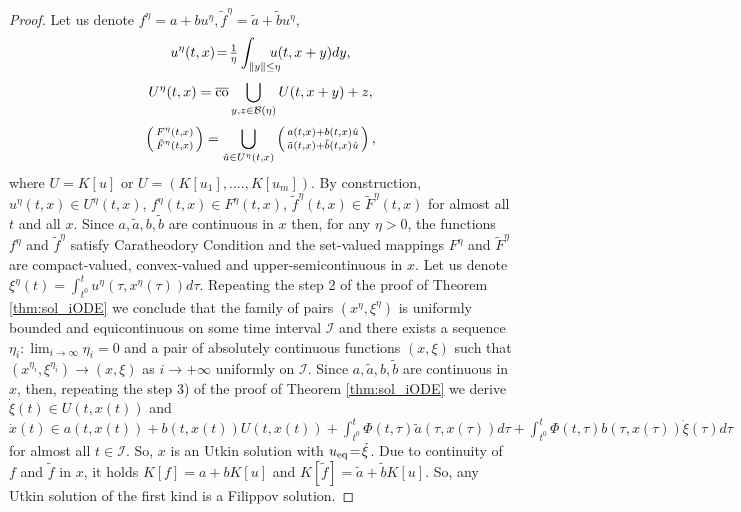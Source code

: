\documentclass{article}
\newcommand{\co}{\mathrm{co}}
\begin{document}
\begin{proof}
{
	Let us denote $f^{\eta}\!=\!a+bu^{\eta}, \tilde f^{\eta}\!=\!\tilde a+\tilde bu^{\eta}$, \vspace{-1mm}
	\[
   u^{\eta}(t,x)\!=\!\tfrac{1}{\eta}\int_{\|y\|\leq \eta} \!\!\!\!\!\!u(t,x+y) dy, \vspace{-1mm}
	\]
\[
U^{\eta}(t,x)=\overline{\co} \bigcup_{y,z\in \mathcal{B}(\eta)}  U(t,x+y)+z,\vspace{-1mm}
\]
\[
\left( 
\begin{smallmatrix}
	F^{\eta}(t,x)\\
	\tilde F^{\eta}(t,x)
\end{smallmatrix}
\right)=  \bigcup_{\hat u\in U^{\eta}(t,x)} \left( 
\begin{smallmatrix}
	a(t,x)+b(t,x)\hat u\\
	\tilde a(t,x)+\tilde b(t,x)\hat u
\end{smallmatrix}
\right),\vspace{-1mm}
\]
where $U=K[u]$ or $U=(K[u_1],....,K[u_m])$.
By construction, $u^{\eta}(t,x)\in U^{\eta}(t,x)$, $f^{\eta}(t,x)\in F^{\eta}(t,x)$, $\tilde f^{\eta}(t,x)\in\tilde F^{\eta}(t,x)$ for almost all $t$ and all $x$. Since $a,\tilde a,b,\tilde b$ are continuous in $x$ then, for any $\eta>0$, the functions $f^{\eta}$ and $\tilde f^{\eta}$ satisfy Caratheodory Condition and the set-valued mappings   
$F^{\eta}$ and $\tilde F^{\eta}$ are compact-valued, convex-valued and upper-semicontinuous in $x$. 
Let us denote $\xi^{\eta}(t)=\int^t_{t^0} u^{\eta}(\tau,x^{\eta}(\tau)) d\tau$.
Repeating the step 2 of the proof of Theorem \ref{thm:sol_iODE} 
we conclude that the family of pairs $(x^{\eta},\xi^{\eta})$ 
is uniformly bounded and equicontinuous on some time interval $\mathcal{I}$ and  there exists a sequence $\eta_i :\lim_{i\to \infty}\eta_i=0$ and a pair of absolutely continuous functions $(x,\xi)$ such that $(x^{\eta_i},\xi^{\eta_i})\to (x,\xi)$ as $i\to +\infty$ uniformly on $\mathcal{I}$.
 Since $a,\tilde a,b,\tilde b$ are continuous in $x$, then, repeating the step 3) of the proof of Theorem \ref{thm:sol_iODE} we derive  $\dot \xi(t)\in  U(t,x(t))$ and 
 $\dot x(t)\in   a(t,x(t))+b(t,x(t))U(t,x(t))+ \int^t_{t^0}\Phi(t,\tau) \tilde a(\tau,x(\tau)) d\tau +\int^t_{t^0}\Phi(t,\tau) b(\tau,x(\tau))\dot \xi(\tau)d\tau$
for almost all $t\!\in\! \mathcal{I}$. So, $x$ is an Utkin solution with  $u_{\rm eq}\!=\!\dot \xi$.}
Due to continuity  of $f$ and $\tilde f$ in $x$, it holds  
$ K[f]=a+bK[u]
$ and  
$K[\tilde f]=\tilde a+\tilde bK[u]$.
So, any Utkin solution of the first kind is a Filippov solution.
\end{proof}	
\end{document}
